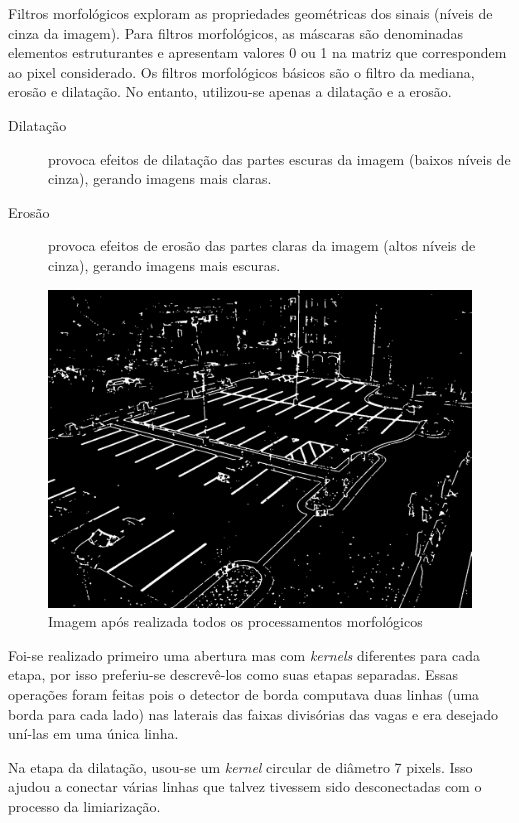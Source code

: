 \documentclass[10pt,twocolumn,letterpaper]{article}
\begin{document}
	Filtros morfológicos exploram as propriedades geométricas dos sinais (níveis de cinza
da imagem). Para filtros morfológicos, as máscaras são denominadas elementos
estruturantes e apresentam valores 0 ou 1 na matriz que correspondem ao pixel considerado.
Os filtros morfológicos básicos são o filtro da mediana, erosão e dilatação. No entanto,
utilizou-se apenas a dilatação e a erosão.

\begin{description}
\item [Dilatação] provoca efeitos de dilatação das partes escuras da imagem (baixos níveis
de cinza), gerando imagens mais claras.
\item [Erosão] provoca efeitos de erosão das partes claras da imagem (altos níveis de
cinza), gerando imagens mais escuras.
\end{description}


\begin{figure}[!htb]
\centering
\includegraphics[scale=0.15]{morph-operado.jpg}
\caption{Imagem após realizada todos os processamentos morfológicos}
\label{Rotulo}
\end{figure}

	Foi-se realizado primeiro uma abertura mas com \emph{kernels} diferentes para cada
etapa, por isso preferiu-se descrevê-los como suas etapas separadas. Essas operações foram
feitas pois o detector de borda computava duas linhas (uma borda para cada lado) nas laterais
das faixas divisórias das vagas e era desejado uní-las em uma única linha.

	Na etapa da dilatação, usou-se um \emph{kernel} circular de diâmetro 7 pixels. Isso ajudou
a conectar várias linhas que talvez tivessem sido desconectadas com o processo da limiarização.
\end{document}
